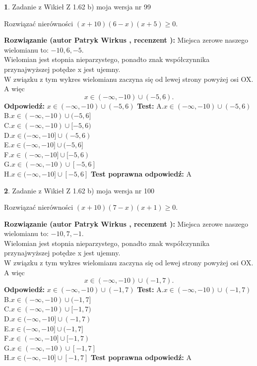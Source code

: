 \documentclass[12pt, a4paper]{article}
\theoremstyle{definition} %
\newtheorem{zad}{}
\newcommand{\zadStart}[1]{\begin{zad}#1\newline}
\newcommand{\zadStop}{\end{zad}}
\newcommand{\rozwStart}[2]{\noindent \textbf{Rozwiązanie (autor #1 , recenzent #2): }\newline}
\newcommand{\rozwStop}{\newline}
\newcommand{\odpStart}{\noindent \textbf{Odpowiedź:}\newline}
\newcommand{\odpStop}{\newline}
\newcommand{\testStart}{\noindent \textbf{Test:}\newline}
\newcommand{\testStop}{\newline}
\newcommand{\kluczStart}{\noindent \textbf{Test poprawna odpowiedź:}\newline}
\newcommand{\kluczStop}{\newline}
\begin{document}
\zadStart{Zadanie z Wikieł Z 1.62 b) moja wersja nr 99}

Rozwiązać nierówności $(x+10)(6-x)(x+5)\ge0$.
\zadStop
\rozwStart{Patryk Wirkus}{}
Miejsca zerowe naszego wielomianu to: $-10, 6, -5$.\\
Wielomian jest stopnia nieparzystego, ponadto znak współczynnika przy\linebreak najwyższej potędze x jest ujemny.\\ W związku z tym wykres wielomianu zaczyna się od lewej strony powyżej osi OX. A więc $$x \in (-\infty,-10) \cup (-5,6).$$
\rozwStop
\odpStart
$x \in (-\infty,-10) \cup (-5,6)$
\odpStop
\testStart
A.$x \in (-\infty,-10) \cup (-5,6)$\\
B.$x \in (-\infty,-10) \cup (-5,6]$\\
C.$x \in (-\infty,-10) \cup [-5,6)$\\
D.$x \in (-\infty,-10] \cup (-5,6)$\\
E.$x \in (-\infty,-10] \cup (-5,6]$\\
F.$x \in (-\infty,-10] \cup [-5,6)$\\
G.$x \in (-\infty,-10) \cup [-5,6]$\\
H.$x \in (-\infty,-10] \cup [-5,6]$
\testStop
\kluczStart
A
\kluczStop



\zadStart{Zadanie z Wikieł Z 1.62 b) moja wersja nr 100}

Rozwiązać nierówności $(x+10)(7-x)(x+1)\ge0$.
\zadStop
\rozwStart{Patryk Wirkus}{}
Miejsca zerowe naszego wielomianu to: $-10, 7, -1$.\\
Wielomian jest stopnia nieparzystego, ponadto znak współczynnika przy\linebreak najwyższej potędze x jest ujemny.\\ W związku z tym wykres wielomianu zaczyna się od lewej strony powyżej osi OX. A więc $$x \in (-\infty,-10) \cup (-1,7).$$
\rozwStop
\odpStart
$x \in (-\infty,-10) \cup (-1,7)$
\odpStop
\testStart
A.$x \in (-\infty,-10) \cup (-1,7)$\\
B.$x \in (-\infty,-10) \cup (-1,7]$\\
C.$x \in (-\infty,-10) \cup [-1,7)$\\
D.$x \in (-\infty,-10] \cup (-1,7)$\\
E.$x \in (-\infty,-10] \cup (-1,7]$\\
F.$x \in (-\infty,-10] \cup [-1,7)$\\
G.$x \in (-\infty,-10) \cup [-1,7]$\\
H.$x \in (-\infty,-10] \cup [-1,7]$
\testStop
\kluczStart
A
\kluczStop
\end{document}

